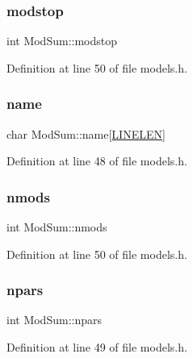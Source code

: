 \mbox{\label{struct_mod_sum_a5d33cc5bdf1c37261fd3894363fd3559}} 
\subsubsection{\texorpdfstring{modstop}{modstop}}
{\footnotesize\ttfamily int Mod\+Sum\+::modstop}



Definition at line 50 of file models.\+h.

\mbox{\label{struct_mod_sum_a360933be5b04ace92a3d9d723a889fda}} 
\subsubsection{\texorpdfstring{name}{name}}
{\footnotesize\ttfamily char Mod\+Sum\+::name\mbox{[}\hyperlink{wind__updates2d_8c_a764eaf37b6117ac7a17b1c049c1d2d16}{L\+I\+N\+E\+L\+EN}\mbox{]}}



Definition at line 48 of file models.\+h.

\mbox{\label{struct_mod_sum_aa4f5d4bf3e99f8ebacb170f7ac660d39}} 
\subsubsection{\texorpdfstring{nmods}{nmods}}
{\footnotesize\ttfamily int Mod\+Sum\+::nmods}



Definition at line 50 of file models.\+h.

\mbox{\label{struct_mod_sum_acdae6177bed0c926e9e494fca75dd1be}} 
\subsubsection{\texorpdfstring{npars}{npars}}
{\footnotesize\ttfamily int Mod\+Sum\+::npars}



Definition at line 49 of file models.\+h.

